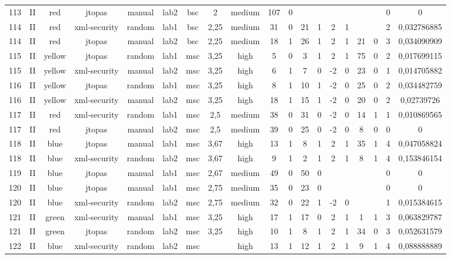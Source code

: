 \begin{table}[ht]
\begin{tabular}{c c c c c c c c c c c c c c c c c c c}
\\113 & II & red & jtopas & manual & lab2 & bsc & 2 & medium & 107 & 0 &  &  &  &  &  &  & 0 & 0
\\114 & II & red & xml-security & random & lab1 & bsc & 2,25 & medium & 31 & 0 & 21 & 1 & 2 & 1 &  &  & 2 & 0,032786885
\\114 & II & red & jtopas & manual & lab2 & bsc & 2,25 & medium & 18 & 1 & 26 & 1 & 2 & 1 & 21 & 0 & 3 & 0,034090909
\\115 & II & yellow & jtopas & random & lab1 & msc & 3,25 & high & 5 & 0 & 3 & 1 & 2 & 1 & 75 & 0 & 2 & 0,017699115
\\115 & II & yellow & xml-security & manual & lab2 & msc & 3,25 & high & 6 & 1 & 7 & 0 & -2 & 0 & 23 & 0 & 1 & 0,014705882
\\116 & II & yellow & jtopas & random & lab1 & msc & 3,25 & high & 8 & 1 & 10 & 1 & -2 & 0 & 25 & 0 & 2 & 0,034482759
\\116 & II & yellow & xml-security & manual & lab2 & msc & 3,25 & high & 18 & 1 & 15 & 1 & -2 & 0 & 20 & 0 & 2 & 0,02739726
\\117 & II & red & xml-security & random & lab1 & msc & 2,5 & medium & 38 & 0 & 31 & 0 & -2 & 0 & 14 & 1 & 1 & 0,010869565
\\117 & II & red & jtopas & manual & lab2 & msc & 2,5 & medium & 39 & 0 & 25 & 0 & -2 & 0 & 8 & 0 & 0 & 0
\\118 & II & blue & jtopas & manual & lab1 & msc & 3,67 & high & 13 & 1 & 8 & 1 & 2 & 1 & 35 & 1 & 4 & 0,047058824
\\118 & II & blue & xml-security & random & lab2 & msc & 3,67 & high & 9 & 1 & 2 & 1 & 2 & 1 & 8 & 1 & 4 & 0,153846154
\\119 & II & blue & jtopas & manual & lab1 & msc & 2,67 & medium & 49 & 0 & 50 & 0 &  &  &  &  & 0 & 0
\\120 & II & blue & jtopas & manual & lab1 & msc & 2,75 & medium & 35 & 0 & 23 & 0 &  &  &  &  & 0 & 0
\\120 & II & blue & xml-security & random & lab2 & msc & 2,75 & medium & 32 & 0 & 22 & 1 & -2 & 0 &  &  & 1 & 0,015384615
\\121 & II & green & xml-security & manual & lab1 & msc & 3,25 & high & 17 & 1 & 17 & 0 & 2 & 1 & 1 & 1 & 3 & 0,063829787
\\121 & II & green & jtopas & random & lab2 & msc & 3,25 & high & 10 & 1 & 8 & 1 & 2 & 1 & 34 & 0 & 3 & 0,052631579
\\122 & II & blue & xml-security & random & lab2 & msc &  & high & 13 & 1 & 12 & 1 & 2 & 1 & 9 & 1 & 4 & 0,088888889

\end{tabular}
\end{table}
